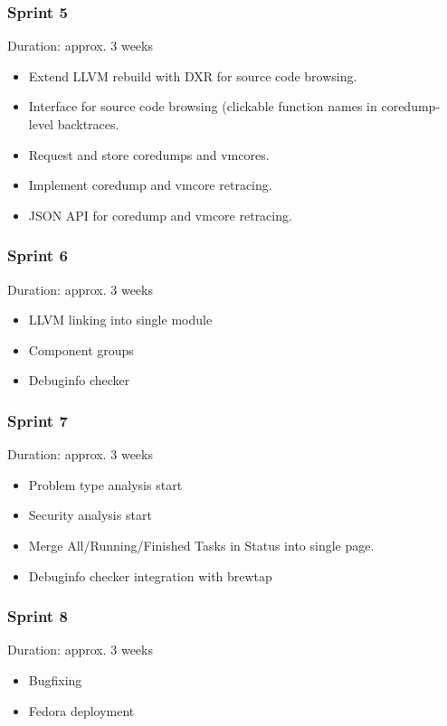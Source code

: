 \documentclass{article}
\begin{document}
\cleardoublepage
\subsubsection{Sprint 5}
Duration: approx. 3 weeks

\begin{itemize}
\item Extend LLVM rebuild with DXR for source code browsing.
\item Interface for source code browsing (clickable function names in
  coredump-level backtraces.
\item Request and store coredumps and vmcores.
\item Implement coredump and vmcore retracing.
\item JSON API for coredump and vmcore retracing.
\end{itemize}

\cleardoublepage
\subsubsection{Sprint 6}
Duration: approx. 3 weeks

\begin{itemize}
\item LLVM linking into single module
\item Component groups
\item Debuginfo checker
\end{itemize}

\cleardoublepage
\subsubsection{Sprint 7}
Duration: approx. 3 weeks

\begin{itemize}
\item Problem type analysis start
\item Security analysis start
\item Merge All/Running/Finished Tasks in Status into single page.
\item Debuginfo checker integration with brewtap
\end{itemize}

\cleardoublepage
\subsubsection{Sprint 8}
Duration: approx. 3 weeks

\begin{itemize}
\item Bugfixing
\item Fedora deployment
\end{itemize}
\end{document}
